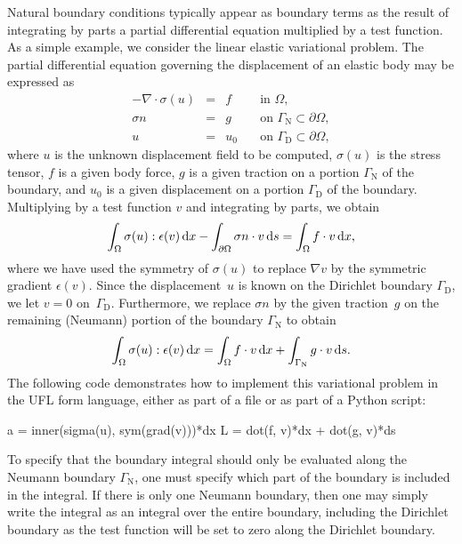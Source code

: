 Natural boundary conditions typically appear as boundary terms as the
result of integrating by parts a partial differential equation multiplied
by a test function. As a simple example, we consider the linear elastic
variational problem. The partial differential equation governing the
displacement of an elastic body may be expressed as
\begin{equation} \label{eq:logg-2:elasticity}
  \begin{array}{rcll}
    - \nabla \cdot \sigma(u) &=& f \quad &\mbox{in } \Omega,
    \\
    \sigma n &=& g \quad  &\mbox{on } \Gamma_{\mathrm{N}} \subset \partial\Omega,
    \\
    u &=& u_0 \quad  &\mbox{on } \Gamma_{\mathrm{D}} \subset \partial\Omega,
    \end{array}
\end{equation}
where $u$ is the unknown displacement field to be computed,
$\sigma(u)$ is the stress tensor, $f$ is a given body force, $g$ is a
given traction on a portion $\Gamma_{\mathrm{N}}$ of the boundary, and
$u_0$ is a given displacement on a portion $\Gamma_{\mathrm{D}}$ of
the boundary. Multiplying by a test function $v$ and integrating by
parts, we obtain
\begin{equation}
  \int_{\Omega} \sigma(u) : \epsilon(v) \, \mathrm{d}x - \int_{\partial\Omega}
  \sigma n \cdot v \, \mathrm{d}s = \int_{\Omega} f \cdot v \, \mathrm{d}x,
\end{equation}
where we have used the symmetry of $\sigma(u)$ to replace $\nabla v$
by the symmetric gradient $\epsilon(v)$. Since the displacement~$u$
is known on the Dirichlet boundary $\Gamma_{\mathrm{D}}$, we let $v =
0$ on~$\Gamma_{\mathrm{D}}$. Furthermore, we replace $\sigma n$ by the
given traction~$g$ on the remaining (Neumann) portion of the boundary
$\Gamma_{\mathrm{N}}$ to obtain
\begin{equation}
  \int_{\Omega} \sigma(u) : \epsilon(v) \, \mathrm{d}x
    = \int_{\Omega} f \cdot v \, \mathrm{d}x + \int_{\Gamma_{\mathrm{N}}} g \cdot v \, \mathrm{d}s.
\end{equation}
The following code demonstrates how to implement this variational
problem in the UFL form language, either as part of a  file
or as part of a Python script:
\begin{uflcode}
a = inner(sigma(u), sym(grad(v)))*dx
L = dot(f, v)*dx + dot(g, v)*ds
\end{uflcode}

To specify that the boundary integral  should only
be evaluated along the Neumann boundary $\Gamma_{\mathrm{N}}$, one
must specify which part of the boundary is included in the 
integral. If there is only one Neumann boundary, then one may simply
write the  integral as an integral over the entire boundary,
including the Dirichlet boundary as the test function  will be
set to zero along the Dirichlet boundary.

